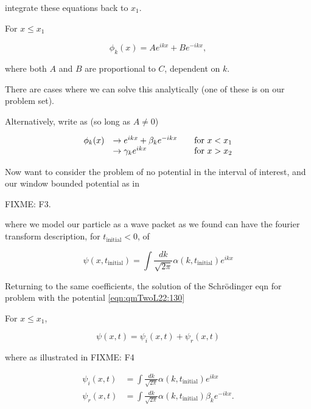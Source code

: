integrate these equations back to $x_1$.

For $x \le x_1$

\begin{equation}\label{eqn:qmTwoL22:110}
\phi_k(x) = A e^{i k x} + B e^{-i k x},
\end{equation}

where both $A$ and $B$ are proportional to $C$, dependent on $k$.

There are cases where we can solve this analytically (one of these is on our problem set).

Alternatively, write as (so long as $A \ne 0$)

\begin{equation}\label{eqn:qmTwoL22:130}
\begin{array}{l l l}
\phi_k(x) 
&\rightarrow e^{i k x} + \beta_k e^{-i k x} & \quad \mbox{for $x < x_1$} \\
&\rightarrow \gamma_k e^{i k x} & \quad \mbox{for $x > x_2$}
\end{array}
\end{equation}

Now want to consider the problem of no potential in the interval of interest, and our window bounded potential as in 

FIXME: F3.

where we model our particle as a wave packet as we found can have the fourier transform description, for $t_{\text{initial}} < 0$, of

\begin{equation}\label{eqn:qmTwoL22:150}
\psi(x, t_{\text{initial}}) = \int \frac{dk}{\sqrt{2 \pi}} \alpha(k, t_{\text{initial}}) e^{i k x}
\end{equation}

Returning to the same coefficients, the solution of the Schr\"{o}dinger eqn for problem with the potential \ref{eqn:qmTwoL22:130}

For $x \le x_1$, 

\begin{equation}\label{eqn:qmTwoL22:190}
\psi(x, t) = \psi_i(x, t) + \psi_r(x, t)
\end{equation}

where as illustrated in 
FIXME: F4

\begin{align}\label{eqn:qmTwoL22:210}
\psi_i(x, t) &= \int \frac{dk}{\sqrt{2 \pi}} \alpha(k, t_{\text{initial}}) e^{i k x} \\
\psi_r(x, t) &= \int \frac{dk}{\sqrt{2 \pi}} \alpha(k, t_{\text{initial}}) \beta_k e^{-i k x}.
\end{align}

